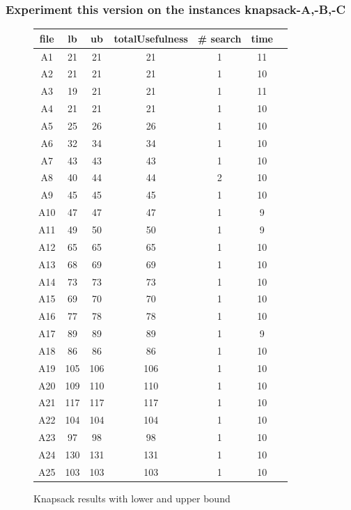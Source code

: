 \documentclass[a4paper ,12pt,french]{article}
\begin{document}
\subsubsection{Experiment this version on the instances knapsack-A,-B,-C}

\begin{figure}[!h]
\begin{tabular}{|c|c|c|c|c|c|c|}
\hline
file&lb&ub&totalUsefulness&\# search&time\\
\hline
\hline
A1&21&21&21&1&11\\\hline
A2&21&21&21&1&10\\\hline
A3&19&21&21&1&11\\\hline
A4&21&21&21&1&10\\\hline
A5&25&26&26&1&10\\\hline
A6&32&34&34&1&10\\\hline
A7&43&43&43&1&10\\\hline
A8&40&44&44&2&10\\\hline
A9&45&45&45&1&10\\\hline
A10&47&47&47&1&9\\\hline
A11&49&50&50&1&9\\\hline
A12&65&65&65&1&10\\\hline
A13&68&69&69&1&10\\\hline
A14&73&73&73&1&10\\\hline
A15&69&70&70&1&10\\\hline
A16&77&78&78&1&10\\\hline
A17&89&89&89&1&9\\\hline
A18&86&86&86&1&10\\\hline
A19&105&106&106&1&10\\\hline
A20&109&110&110&1&10\\\hline
A21&117&117&117&1&10\\\hline
A22&104&104&104&1&10\\\hline
A23&97&98&98&1&10\\\hline
A24&130&131&131&1&10\\\hline
A25&103&103&103&1&10\\\hline

\end{tabular}
\caption{Knapsack results with lower and upper bound}
\label{LUA}
\end{figure}
\end{document}

